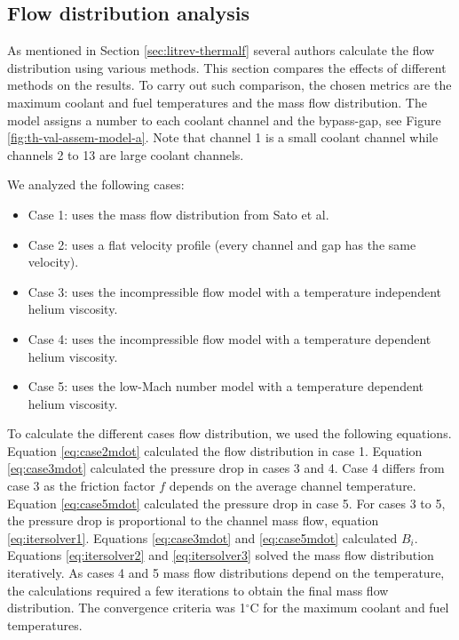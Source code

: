 \subsection{Flow distribution analysis}

As mentioned in Section \ref{sec:litrev-thermalf} several authors calculate the flow distribution using various methods.
This section compares the effects of different methods on the results.
To carry out such comparison, the chosen metrics are the maximum coolant and fuel temperatures and the mass flow distribution.
The model assigns a number to each coolant channel and the bypass-gap, see Figure \ref{fig:th-val-assem-model-a}.
Note that channel 1 is a small coolant channel while channels 2 to 13 are large coolant channels.

We analyzed the following cases:
\begin{itemize}
    \item Case 1: uses the mass flow distribution from Sato et al.
    \item Case 2: uses a flat velocity profile (every channel and gap has the same velocity).
    \item Case 3: uses the incompressible flow model with a temperature independent helium viscosity.
    \item Case 4: uses the incompressible flow model with a temperature dependent helium viscosity.
    \item Case 5: uses the low-Mach number model with a temperature dependent helium viscosity.
\end{itemize}

To calculate the different cases flow distribution, we used the following equations.
Equation \ref{eq:case2mdot} calculated the flow distribution in case 1.
Equation \ref{eq:case3mdot} \cite{melese_thermal_1984} calculated the pressure drop in cases 3 and 4.
Case 4 differs from case 3 as the friction factor $f$ depends on the average channel temperature.
Equation \ref{eq:case5mdot} \cite{melese_thermal_1984} calculated the pressure drop in case 5.
For cases 3 to 5, the pressure drop is proportional to the channel mass flow, equation \ref{eq:itersolver1}.
Equations \ref{eq:case3mdot} and \ref{eq:case5mdot} calculated $B_i$.
Equations \ref{eq:itersolver2} and \ref{eq:itersolver3} solved the mass flow distribution iteratively.
As cases 4 and 5 mass flow distributions depend on the temperature, the calculations required a few iterations to obtain the final mass flow distribution.
The convergence criteria was 1$^{\circ}$C for the maximum coolant and fuel temperatures.

